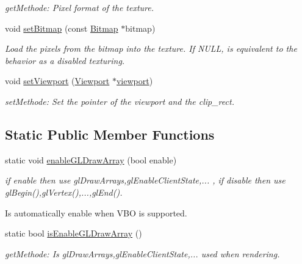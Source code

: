 \begin{DoxyCompactItemize}
\begin{DoxyCompactList}\small\item\em getMethode: Pixel format of the texture. \item\end{DoxyCompactList}\item 
void \hyperlink{class_f2_c_1_1_array_sprite_af4812f3e122823e29d8d6f82d64799ac}{setBitmap} (const \hyperlink{class_f2_c_1_1_bitmap}{Bitmap} $\ast$bitmap)
\begin{DoxyCompactList}\small\item\em Load the pixels from the bitmap into the texture. If NULL, is equivalent to the behavior as a disabled texturing. \item\end{DoxyCompactList}\item 
void \hyperlink{class_f2_c_1_1_array_sprite_a960ba03bf1797621f00aaad269776dd2}{setViewport} (\hyperlink{class_f2_c_1_1_viewport}{Viewport} $\ast$\hyperlink{class_f2_c_1_1_array_sprite_acbf1252a3782ba0a09c14b0b52fd48b8}{viewport})
\begin{DoxyCompactList}\small\item\em setMethode: Set the pointer of the viewport and the clip\_\-rect. \item\end{DoxyCompactList}\end{DoxyCompactItemize}
\subsection*{Static Public Member Functions}
\begin{DoxyCompactItemize}
\item 
static void \hyperlink{class_f2_c_1_1_array_sprite_accd803dbbff19b7bfa6ba710699dfaf5}{enableGLDrawArray} (bool enable)
\begin{DoxyCompactList}\small\item\em if enable then use glDrawArrays,glEnableClientState,... , if disable then use glBegin(),glVertex(),...,glEnd(). \par
 Is automatically enable when VBO is supported. \item\end{DoxyCompactList}\item 
\hypertarget{class_f2_c_1_1_array_sprite_a5e8fce595952f80096b70a4f5fee9b2e}{
static bool \hyperlink{class_f2_c_1_1_array_sprite_a5e8fce595952f80096b70a4f5fee9b2e}{isEnableGLDrawArray} ()}
\label{class_f2_c_1_1_array_sprite_a5e8fce595952f80096b70a4f5fee9b2e}

\begin{DoxyCompactList}\small\item\em getMethode: Is glDrawArrays,glEnableClientState,... used when rendering. \item\end{DoxyCompactList}\end{DoxyCompactItemize}
